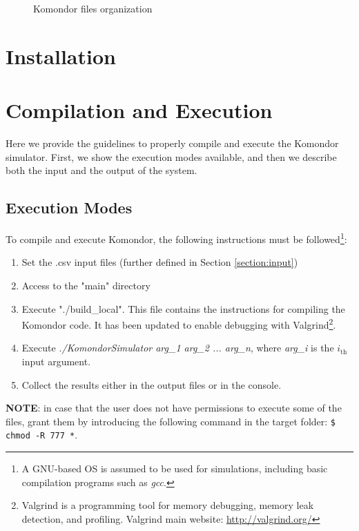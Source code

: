 \documentclass[a4paper]{article}
\begin{document}
	\begin{figure}[h!]
		\centering
		\caption{Komondor files organization}
		\label{fig:komondor_files}
	\end{figure}	

\section{Installation}

\section{Compilation and Execution}
\label{section:execution}
Here we provide the guidelines to properly compile and execute the Komondor simulator. First, we show the execution modes available, and then we describe both the input and the output of the system.

\subsection{Execution Modes}
\label{section:execution_modes}
To compile and execute Komondor, the following instructions must be followed\footnote{A GNU-based OS is assumed to be used for simulations, including basic compilation programs such as \emph{gcc}.}:
\begin{enumerate}
	\item Set the .csv input files (further defined in Section \ref{section:input})
	\item Access to the "main" directory
	\item Execute "./build\_local". This file contains the instructions for compiling the Komondor code. It has been updated to enable debugging with Valgrind\footnote{Valgrind is a programming tool for memory debugging, memory leak detection, and profiling. Valgrind main website: \url{http://valgrind.org/}}.
	\item Execute \textit{./KomondorSimulator arg\_1 arg\_2 ... arg\_n}, where \textit{arg\_i} is the $i_{\text{th}}$ input argument.
	\item Collect the results either in the output files or in the console.
\end{enumerate}

\textbf{NOTE}: in case that the user does not have permissions to execute some of the files, grant them by introducing the following command in the target folder: \texttt{\$ chmod -R 777 *}.
\end{document}
